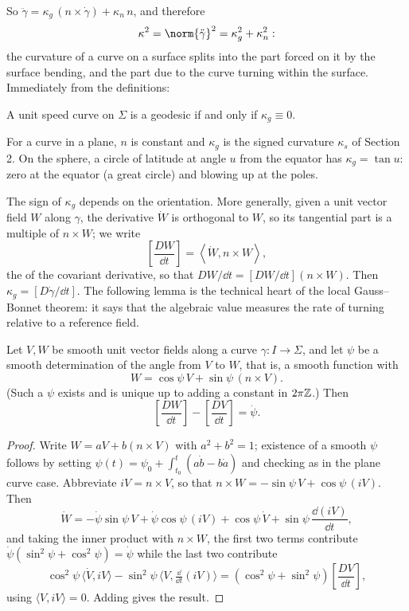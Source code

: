 \documentclass[a4paper]{scrartcl}
\begin{document}
So $\ddot\gamma = \kappa_g\, (n\times\dot\gamma) + \kappa_n \,n$, and therefore
$$
\kappa^2 = \norm{\ddot\gamma}^2 = \kappa_g^2 + \kappa_n^2 :
$$
the curvature of a curve on a surface splits into the part forced on it by the surface bending, and the part due to the curve turning within the surface. Immediately from the definitions:

\begin{proposition}
    A unit speed curve on $\Sigma$ is a geodesic if and only if $\kappa_g \equiv 0$.
\end{proposition}

\begin{example}
    For a curve in a plane, $n$ is constant and $\kappa_g$ is the signed curvature $\kappa_s$ of Section 2. On the sphere, a circle of latitude at angle $u$ from the equator has $\kappa_g = \tan u$: zero at the equator (a great circle) and blowing up at the poles.
\end{example}

The sign of $\kappa_g$ depends on the orientation. More generally, given a unit vector field $W$ along $\gamma$, the derivative $\dot W$ is orthogonal to $W$, so its tangential part is a multiple of $n\times W$; we write
$$
\left[\frac{DW}{\dd t}\right] = \left\langle \dot W, n\times W\right\rangle,
$$
the  of the covariant derivative, so that $DW/\dd t = [DW/\dd t](n\times W)$. Then $\kappa_g = [D\dot\gamma/\dd t]$. The following lemma is the technical heart of the local Gauss--Bonnet theorem: it says that the algebraic value measures the rate of turning relative to a reference field.

\begin{lemma}
    Let $V, W$ be smooth unit vector fields along a curve $\gamma: I \rightarrow \Sigma$, and let $\psi$ be a smooth determination of the angle from $V$ to $W$, that is, a smooth function with
    $$
    W = \cos\psi\, V + \sin\psi\, (n \times V).
    $$
    (Such a $\psi$ exists and is unique up to adding a constant in $2\pi\mathbb{Z}$.) Then
    $$
    \left[\frac{DW}{\dd t}\right] - \left[\frac{DV}{\dd t}\right] = \dot \psi.
    $$
\end{lemma}
\begin{proof}
    Write $W = aV + b(n\times V)$ with $a^2+b^2 = 1$; existence of a smooth $\psi$ follows by setting $\psi(t) = \psi_0 + \int_{t_0}^t (a\dot b - b \dot a)$ and checking as in the plane curve case. Abbreviate $iV = n\times V$, so that $n \times W = -\sin\psi\, V + \cos\psi\, (iV)$. Then
    $$
    \dot W = -\dot\psi\sin\psi\, V + \dot\psi\cos\psi\,(iV) + \cos\psi\,\dot V + \sin\psi\,\frac{\dd (iV)}{\dd t},
    $$
    and taking the inner product with $n\times W$, the first two terms contribute $\dot\psi(\sin^2\psi+\cos^2\psi) = \dot\psi$ while the last two contribute
    $$
    \cos^2\psi\,\langle \dot V, iV\rangle - \sin^2\psi\,\langle V, \tfrac{\dd}{\dd t}(iV)\rangle = \left(\cos^2\psi+\sin^2\psi\right)\left[\frac{DV}{\dd t}\right],
    $$
    using $\langle V, iV\rangle = 0$. Adding gives the result.
\end{proof}
\end{document}
